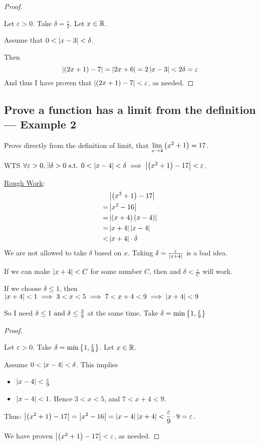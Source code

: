 \begin{proof} \(\)

  Let \(\varepsilon > 0\). Take \(\delta = \frac{\varepsilon}{2}\). Let \(x \in \mathbb{R}\).

  Assume that \(0 < \left|x - 3\right| < \delta\).

  Then
  \[\left|\left(2x + 1\right) - 7\right| = \left|2x + 6\right| = 2 \left|x - 3\right| < 2 \delta = \varepsilon\]
  And thus I have proven that \(\left|\left(2x + 1\right) - 7\right| < \varepsilon\), as needed. \qedhere
\end{proof}

\subsection{Prove a function has a limit from the definition --- Example 2}

Prove directly from the definition of limit, that \(\displaystyle \lim_{x \to 4} \left(x^{2} + 1\right) = 17\).

WTS \(\forall \varepsilon > 0, \exists \delta > 0 \text{ s.t. } 0 < \left|x - 4\right| < \delta \implies \left|\left(x^{2} + 1\right) - 17\right| < \varepsilon\).

\underline{Rough Work}:
\begin{align*}
  &\left|\left(x^{2} + 1\right) - 17\right| \\
  =&\left|x^{2} - 16\right| \\
  =&\left|\left(x + 4\right) \left(x - 4\right)\right| \\
  =&\left|x + 4\right| \left|x - 4\right| \\
  <&\left|x + 4\right| \cdot \delta
\end{align*}
We are not allowed to take \(\delta\) based on \(x\). Taking \(\delta = \frac{\varepsilon}{\left|x + 4\right|}\) is a bad idea.

If we can make \(\left|x + 4\right| < C\) for some number \(C\), then and \(\delta < \frac{\varepsilon}{C}\) will work.

If we choose \(\delta \leq 1\), then \(\left|x + 4\right| < 1 \implies 3 < x < 5 \implies 7 < x + 4 < 9 \implies \left|x + 4\right| < 9\)

So I need \(\delta \leq 1 \text{ and } \delta \leq \frac{3}{9}\) at the same time. {\color{red}Take \(\delta = \min\left\{1, \frac{\varepsilon}{9}\right\}\)}

\begin{proof} \(\)

  Let \(\varepsilon > 0\). Take \(\delta = \min\left\{1, \frac{\varepsilon}{9}\right\}\). Let \(x \in \mathbb{R}\).

  Assume \(0 < \left|x - 4\right| < \delta\). This implies
  \begin{itemize}
    \item \(\left|x - 4\right| < \frac{\varepsilon}{9}\)
    \item \(\left|x - 4\right| < 1\). Hence \(3 < x < 5\), and \(7 < x + 4 < 9\).
  \end{itemize}

  Thus: \(\displaystyle \left|\left(x^{2} + 1\right) - 17\right| = \left|x^{2} - 16\right| = \left|x - 4\right| \left|x + 4\right| < \frac{\varepsilon}{9} \cdot 9 = \varepsilon\).

  We have proven \(\left|\left(x^{2} + 1\right) - 17\right| < \varepsilon\), as needed. \qedhere
\end{proof}

